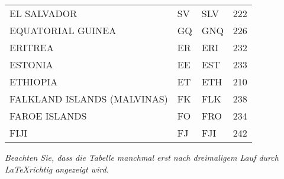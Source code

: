 \begin{footnotesize}
\begin{longtable}[c]{ p{} p{} p{} p{}}
    EL SALVADOR                                    & SV & SLV & 222 \\
    EQUATORIAL GUINEA                              & GQ & GNQ & 226 \\
    ERITREA                                        & ER & ERI & 232 \\
    ESTONIA                                        & EE & EST & 233 \\
    ETHIOPIA                                       & ET & ETH & 210 \\
    FALKLAND ISLANDS (MALVINAS)                    & FK & FLK & 238 \\
    FAROE ISLANDS                                  & FO & FRO & 234 \\
    FIJI                                           & FJ & FJI & 242 \\
    \bottomrule
  \end{longtable}
\end{footnotesize}
\rmfamily


\textit{Beachten Sie, dass die Tabelle manchmal erst nach dreimaligem Lauf durch \LaTeX richtig angezeigt wird.}
